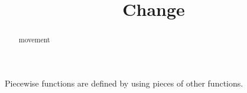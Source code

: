 \documentclass{ximera}
\title{Change}
\begin{document}
\begin{abstract}
movement
\end{abstract}
\maketitle



Piecewise functions are defined by using pieces of other functions.
\end{document}

